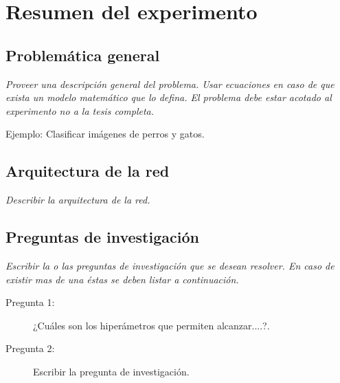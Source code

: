 \documentclass[11pt,twoside,letterpaper]{article}
\begin{document}




\section{Resumen del experimento}

\subsection{Problemática general}

\emph{Proveer una descripción general del problema. Usar ecuaciones en caso de que exista un modelo matemático que lo defina. El problema debe estar acotado al experimento no a la tesis completa.}

Ejemplo: Clasificar imágenes de perros y gatos.

\subsection{Arquitectura de la red}

\emph{Describir la arquitectura de la red.}

\subsection{Preguntas de investigación}

\emph{Escribir la o las preguntas de investigación que se desean resolver. En caso de existir mas de una éstas se deben listar a continuación.}


\begin{description}
\item [Pregunta 1:] ¿Cuáles son los hiperámetros que permiten alcanzar....?. 
\item [Pregunta 2:] Escribir la pregunta de investigación.
\end{description}
\end{document}

